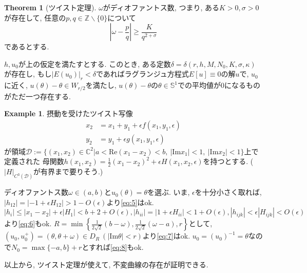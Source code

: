 \documentclass[a4paper]{ujarticle}
\numberwithin{equation}{section}
\theoremstyle{definition}
\newtheorem{theorem}{Theorem}
\newtheorem{example}{Example}
\begin{document}
        \begin{theorem}[ツイスト定理]
            $\omega$がディオファントス数, つまり, ある$K > 0, \sigma > 0$が存在して, 
            任意の$p, q \in \mathbb{Z} \backslash \{0\}$について
            \begin{equation}
                |\omega - \frac{p}{q}| \geq \frac{K}{q^{2 + \sigma}}
            \end{equation}
            であるとする.

            $h, u_0$が上の仮定を満たすとする. このとき, ある定数$\delta = \delta(r, h, M, N_0, K, \sigma, \kappa)$が存在し,
            もし$|E(u_0)|_r < \delta$であればラグランジュ方程式$E[u] \equiv 0$の解$u$で, $u_0$に近く, $u(\theta) - \theta \in W_{r/2}$を満たし, 
            $u(\theta) - \theta$の$\theta \in \mathbb{S}^1$での平均値が$0$になるものがただ一つ存在する.
        \end{theorem}

        \begin{example}
            摂動を受けたツイスト写像
            \begin{align}
                x_2 &= x_1 + y_1 + \epsilon f(x_1, y_1, \epsilon) \\
                y_2 &= y_1 + \epsilon g(x_1, y_1, \epsilon)
            \end{align}
            が領域$\mathcal{D} := \{(x_1, x_2) \in \mathbb{C}^2 | a < \mathrm{Re}(x_1 - x_2) < b, \ |\mathrm{Im} x_1| < 1, \ |\mathrm{Im} x_2| < 1\}$上で定義された
            母関数$h(x_1, x_2) = \frac{1}{2}(x_1 - x_2)^2 + \epsilon H(x_1, x_2, \epsilon)$を持つとする. ($|H|_{C^3(\mathcal{D})}$が有界まで要りそう.)

            ディオファントス数$\omega \in (a, b)$と$u_0(\theta) = \theta$を選ぶ.
            いま, $\epsilon$を十分小さく取れば, 
            $|h_{12}| = |- 1 + \epsilon H_{12}| > 1 - O(\epsilon)$より\eqref{eq:5}はok.
            $|h_{i}| \leq |x_1 - x_2| + \epsilon |H_{1}| < b + 2 + O(\epsilon), |h_{ii}| = |1 + \epsilon H_{ii}|  < 1 + O(\epsilon), |h_{ijk}| < \epsilon|H_{ijk}| < O(\epsilon)$
            より\eqref{eq:6}もok. 
            $\displaystyle R =  \min\left\{\frac{1}{2\sqrt{2}}(b - \omega), \frac{1}{2\sqrt{2}}(\omega - a), r\right\}$として, 
            $(u_0, u^{+}_0) = (\theta, \theta + \omega) \in D_{R} \ (|\mathrm{Im} \theta| < r)$より\eqref{eq:7}はok.
            $u_0 = (u_0)^{-1} = \theta$なので$N_0 = \max\{-a, b\} + r$とすれば\eqref{eq:8}もok.

            以上から, ツイスト定理が使えて, 不変曲線の存在が証明できる.
        \end{example}
\end{document}

